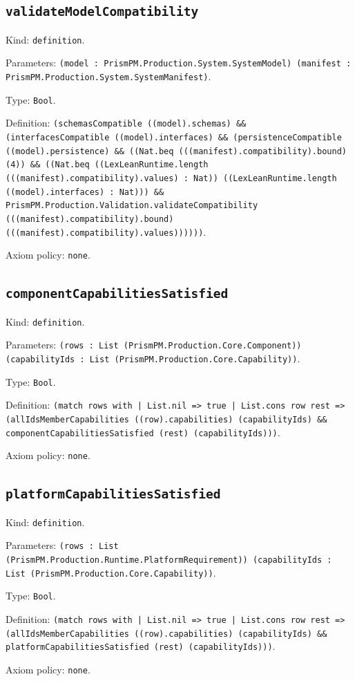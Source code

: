 \documentclass[11pt]{article}
\begin{document}
\subsection*{\texttt{validateModelCompatibility}}
\noindent Kind: \texttt{definition}.\par
\noindent Parameters: \texttt{(model : PrismPM.Production.System.SystemModel) (manifest : PrismPM.Production.System.SystemManifest)}.\par
\noindent Type: \texttt{Bool}.\par
\noindent Definition: \texttt{(schemasCompatible ((model).schemas) \&\& (interfacesCompatible ((model).interfaces) \&\& (persistenceCompatible ((model).persistence) \&\& ((Nat.beq (((manifest).compatibility).bound) (4)) \&\& ((Nat.beq ((LexLeanRuntime.length (((manifest).compatibility).values) : Nat)) ((LexLeanRuntime.length ((model).interfaces) : Nat))) \&\& PrismPM.Production.Validation.validateCompatibility (((manifest).compatibility).bound) (((manifest).compatibility).values))))))}.\par
\noindent Axiom policy: \texttt{none}.\par
\subsection*{\texttt{componentCapabilitiesSatisfied}}
\noindent Kind: \texttt{definition}.\par
\noindent Parameters: \texttt{(rows : List (PrismPM.Production.Core.Component)) (capabilityIds : List (PrismPM.Production.Core.Capability))}.\par
\noindent Type: \texttt{Bool}.\par
\noindent Definition: \texttt{(match rows with | List.nil => true | List.cons row rest => (allIdsMemberCapabilities ((row).capabilities) (capabilityIds) \&\& componentCapabilitiesSatisfied (rest) (capabilityIds)))}.\par
\noindent Axiom policy: \texttt{none}.\par
\subsection*{\texttt{platformCapabilitiesSatisfied}}
\noindent Kind: \texttt{definition}.\par
\noindent Parameters: \texttt{(rows : List (PrismPM.Production.Runtime.PlatformRequirement)) (capabilityIds : List (PrismPM.Production.Core.Capability))}.\par
\noindent Type: \texttt{Bool}.\par
\noindent Definition: \texttt{(match rows with | List.nil => true | List.cons row rest => (allIdsMemberCapabilities ((row).capabilities) (capabilityIds) \&\& platformCapabilitiesSatisfied (rest) (capabilityIds)))}.\par
\noindent Axiom policy: \texttt{none}.\par
\end{document}

